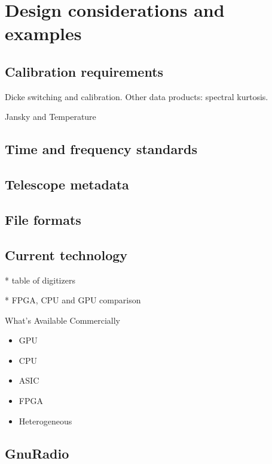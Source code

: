 \documentclass{ws-rv961x669}
\begin{document}



\section{Design considerations and examples}

\subsection{Calibration requirements}
Dicke switching and calibration. Other data products: spectral kurtosis.

Jansky and Temperature 
\subsection{Time and frequency standards}
\subsection{Telescope metadata}
\subsection{File formats}


\subsection{Current technology}

* table of digitizers

* FPGA, CPU and GPU comparison

What's Available Commercially

\begin{itemize}
	\item GPU
    \item CPU
    \item ASIC
    \item FPGA
    \item Heterogeneous	
\end{itemize}


\subsection{GnuRadio}
\end{document}

